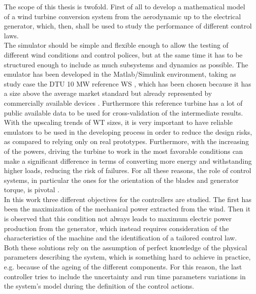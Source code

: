 The scope of this thesis is twofold. First of all to develop a mathematical model of a wind turbine conversion system from the aerodynamic up to the electrical generator, which, then, shall be used to study the performance of different control laws.\\
The simulator should be simple and flexible enough to allow the testing of different wind conditions and control polices, but at the same time it has to be structured enough to include as much subsystems and dynamics as possible. The emulator has been developed in the Matlab/Simulink environment, taking as study case the DTU 10 MW reference \acrfull{WS} \cite{DTU_Wind_Energy_Report-I-0092}, which has been chosen because it has a size above the average market standard but already represented by commercially available devices \cite{wind_europe_data_2022}. Furthermore this reference turbine has a lot of public available data to be used for cross-validation of the intermediate results.\\
With the upscaling trends of \acrfull{WT} sizes, it is very important to have reliable emulators to be used in the developing process in order to reduce the design risks, as compared to relying only on real prototypes. Furthermore, with the increasing of the powers, driving the turbine to work in the most favorable conditions can make a significant difference in terms of converting more energy and withstanding higher loads, reducing the risk of failures. For all these reasons, the role of control systems, in particular the ones for the orientation of the blades and generator torque, is pivotal .\\
 In this work three different objectives for the controllers are studied. The first has been the maximization of the mechanical power extracted from the wind. Then it is observed that this condition not always leads to maximum electric power production from the generator, which instead requires consideration of the characteristics of the machine and the identification of a tailored control law. Both these solutions rely on the assumption of perfect knowledge of the physical parameters describing the system, which is something hard to achieve in practice, e.g. because of the ageing of the different components. For this reason, the last controller tries to include the uncertainty and run time parameters variations in the system's model during the definition of the control actions.  


